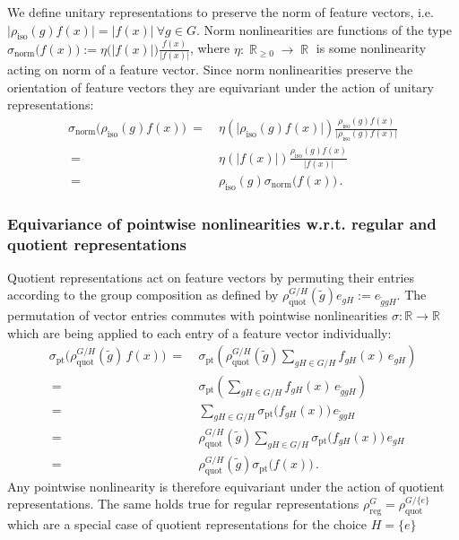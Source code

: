 \documentclass{article}
\DeclareMathOperator*{\R}{\mathbb{R}}
\begin{document}
We define unitary representations to preserve the norm of feature vectors, i.e.
$\big|\rho_\text{iso}(g)f(x)\big| = \big|f(x)\big|\ \forall g\in G$.
Norm nonlinearities are functions of the type
$\sigma_\text{norm}\big(f(x)\big) := \eta\big(|f(x)|\big) \frac{f(x)}{|f(x)|}$,
where $\eta:\R_{\geq0}\to\R$ is some nonlinearity acting on norm of a feature vector.
Since norm nonlinearities preserve the orientation of feature vectors they are equivariant under the action of unitary representations:
\begin{align*}
    \sigma_\text{norm}\big( \rho_\text{iso}(g) f(x) \big)
    \ =&\ \eta\left(\big|\rho_\text{iso}(g)f(x)\big|\right) \frac{\rho_\text{iso}(g)f(x)}{\big|\rho_\text{iso}(g)f(x)\big|} \\
    \ =&\ \eta\left(\big|f(x)\big|\right) \frac{\rho_\text{iso}(g)f(x)}{\big|f(x)\big|} \\
    \ =&\ \rho_\text{iso}(g) \sigma_\text{norm}\big( f(x) \big) \,.
\end{align*}








\subsubsection{Equivariance of pointwise nonlinearities w.r.t. regular and quotient representations}
\label{apx:equivariance_nonlin_quotient}

Quotient representations act on feature vectors by permuting their entries according to the group composition as defined by
$\rho_\text{quot}^{G/H}(\tilde{g}) e_{gH} := e_{\tilde{g}gH}$.
The permutation of vector entries commutes with pointwise nonlinearities $\sigma:\mathbb{R}\to\mathbb{R}$ which are being applied to each entry of a feature vector individually:
\begin{align*}
    \sigma_\text{pt}\big( \rho_\text{quot}^{G/H}(\tilde{g})\, f(x) \big)
    \ =&\ \sigma_\text{pt}\left( \rho_\text{quot}^{G/H}(\tilde{g}) \sum_{gH\in G/H} f_{gH}(x)\, e_{gH} \right) \\
    \ =&\ \sigma_\text{pt}\left( \sum_{gH\in G/H} f_{gH}(x)\, e_{\tilde{g}gH} \right) \\
    \ =&\ \sum_{gH\in G/H} \sigma_\text{pt}\big(f_{gH}(x)\big)\, e_{\tilde{g}gH} \\
    \ =&\ \rho_\text{quot}^{G/H}(\tilde{g}) \sum_{gH\in G/H} \sigma_\text{pt}\big(f_{gH}(x)\big)\, e_{gH} \\
    \ =&\ \rho_\text{quot}^{G/H}(\tilde{g})  \sigma_\text{pt}\big(f(x)\big) \,.
\end{align*}
Any pointwise nonlinearity is therefore equivariant under the action of quotient representations.
The same holds true for regular representations $\rho_\text{reg}^G=\rho_\text{quot}^{G/\{e\}}$ which are a special case of quotient representations for the choice $H=\{e\}$
\end{document}
